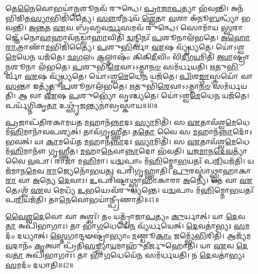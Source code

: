 𑌤𑍇\-\ul{𑌨𑍈}\-𑌵𑍋𑌭𑌯𑌾॑\-\ul{𑌨𑍍𑌪}\-𑌶𑍂𑌨𑌵᳴ 𑌰𑍁𑌨𑍍𑌧𑍇।
\-\ul{𑌪𑍍𑌰𑌾}\-\-\ul{𑌜𑌾}\-\-\ul{𑌪}\-𑌤𑍍𑌯𑌾 𑌭᳴𑌵𑌨𑍍𑌤𑌿।
𑌅𑌨᳴𑌭𑌿\-𑌜𑌿𑌤\-\ul{𑌸𑍍𑌯𑌾}\-𑌭𑌿\-𑌜𑌿᳴𑌤𑍍𑌯𑍈।
\-\ul{𑌸𑍗}\-𑌰𑍀𑌰𑍍𑌨𑌵᳴ \ul{𑌶𑍍𑌵𑍇}\-𑌤𑌾 \ul{𑌵}\-𑌶𑌾 𑌅᳴𑌨𑍂\-\ul{𑌬}\-𑌨𑍍𑌧𑍍𑌯𑌾᳴ 𑌭𑌵𑌨𑍍𑌤𑌿।
\-\ul{𑌅}\-\-\ul{𑌨𑍍𑌤}\-𑌤 \ul{𑌏}\-𑌵 𑌬𑍍𑌰᳴𑌹𑍍𑌮𑌵\-\ul{𑌰𑍍𑌚}\-𑌸𑌮𑌵᳴ 𑌰𑍁𑌨𑍍𑌧𑍇।
𑌸𑍋𑌮𑌾᳴𑌯 \ul{𑌸𑍍𑌵}\-𑌰𑌾𑌜𑍍𑌞𑍇᳴\-𑌽𑌨𑍋\-\ul{𑌵𑌾}\-𑌹𑌾𑌵᳴\-\ul{𑌨}\-𑌡𑍍𑌵𑌾\-\ul{𑌹𑌾}\-𑌵𑌿𑌤𑌿᳴ \ul{𑌦𑍍𑌵}\-𑌨𑍍𑌦𑍍𑌵𑌿𑌨𑌃᳴ \ul{𑌪}\-𑌶𑍂𑌨𑌾𑌲᳴𑌭𑌤𑍇।
\-\ul{𑌅}\-\-\ul{𑌹𑍋}\-\-\ul{𑌰𑌾}\-𑌤𑍍𑌰𑌾𑌣𑌾᳴\-\ul{𑌮}\-𑌭𑌿𑌜𑌿᳴𑌤𑍍𑌯𑍈।
\-\ul{𑌪}\-𑌶𑍁\-\ul{𑌭𑌿}\-𑌰𑍍𑌵𑌾 \ul{𑌏}\-𑌷 𑌵𑍍𑌯𑍃᳴𑌧𑍍𑌯𑌤𑍇।
𑌯𑍋॑𑌽𑌶𑍍𑌵\-\ul{𑌮𑍇}\-𑌧𑍇\-\ul{𑌨} 𑌯𑌜᳴𑌤𑍇।
\-\ul{𑌛}\-\-\ul{𑌗}\-𑌲𑌂 \ul{𑌕}\-𑌲𑍍𑌮𑌾𑌷𑌂᳴ 𑌕𑌿𑌕𑌿\-\ul{𑌦𑍀}\-𑌵𑌿𑌂 𑌵𑌿᳴\-\ul{𑌦𑍀}\-𑌗\-\ul{𑌯}\-𑌮𑌿𑌤𑌿᳴ \ul{𑌤𑍍𑌵𑌾}\-𑌷𑍍𑌟𑍍𑌰𑌾\-\ul{𑌨𑍍𑌪}\-𑌶𑍂𑌨𑌾 𑌲᳴𑌭𑌤𑍇।
\-\ul{𑌪}\-𑌶𑍁𑌭𑌿᳴\-\ul{𑌰𑍇}\-𑌵𑌾𑌽𑌽𑌤𑍍𑌮𑌾\-\ul{𑌨}\-\-\ul{𑍞} 𑌸𑌮᳴𑌰𑍍𑌧𑌯𑌤𑌿।
\-\ul{𑌋}\-𑌤𑍁\-\ul{𑌭𑌿}\-𑌰𑍍𑌵𑌾 \ul{𑌏}\-𑌷 𑌵𑍍𑌯𑍃᳴𑌧𑍍𑌯𑌤𑍇।
𑌯𑍋॑𑌽𑌶𑍍𑌵\-\ul{𑌮𑍇}\-𑌧𑍇\-\ul{𑌨} 𑌯𑌜᳴𑌤𑍇।
\-\ul{𑌪𑌿}\-𑌶\-\ul{𑌙𑍍𑌗𑌾}\-𑌸𑍍𑌤𑍍𑌰𑌯𑍋᳴ 𑌵𑌾\-\ul{𑌸}\-𑌨𑍍𑌤𑌾 𑌇𑌤𑍍𑌯𑍃᳴𑌤𑍁\-\ul{𑌪}\-𑌶𑍂𑌨𑌾𑌲᳴𑌭𑌤𑍇।
\-\ul{𑌋}\-𑌤𑍁𑌭𑌿᳴\-\ul{𑌰𑍇}\-𑌵𑌾𑌽𑌽𑌤𑍍𑌮𑌾\-\ul{𑌨}\-\-\ul{𑍞} 𑌸𑌮᳴𑌰𑍍𑌧𑌯𑌤𑌿।
𑌆 𑌵𑌾 \ul{𑌏}\-𑌷 \ul{𑌪}\-𑌶𑍁𑌭𑍍𑌯𑍋᳴ 𑌵𑍃𑌶𑍍𑌚𑍍𑌯𑌤𑍇।
𑌯𑍋॑𑌽𑌶𑍍𑌵\-\ul{𑌮𑍇}\-𑌧𑍇\-\ul{𑌨} 𑌯𑌜᳴𑌤𑍇।
𑌪𑌰𑍍𑌯᳴𑌗𑍍𑌨𑌿𑌕𑍃\-\ul{𑌤𑌾} 𑌉𑌥𑍍𑌸𑍃᳴\-\ul{𑌜}\-𑌨𑍍𑌤𑍍𑌯𑌨𑌾॑𑌵𑍍𑌰𑌸𑍍𑌕𑌾𑌯॥40॥\anuvakamend[\-\ul{𑌲}\-\-\ul{𑌭𑍍𑌯}\-\-\ul{𑌨𑍍𑌤𑍇} \ul{𑌲}\-\-\ul{𑌭}\-\-\ul{𑌤𑍇} \ul{𑌤𑍍𑌵𑌾}\-𑌷𑍍𑌟𑍍𑌰𑌾\-\ul{𑌨𑍍𑌪}\-𑌶𑍂𑌨𑌾𑌲᳴𑌭\-\ul{𑌤𑍇}\-\-𑌽𑌷𑍍𑌟𑍗 𑌚᳴]

\-\ul{𑌪𑍍𑌰}\-𑌜𑌾𑌪᳴𑌤𑌿𑌰𑌕𑌾𑌮𑌯𑌤 \ul{𑌮}\-𑌹𑌾𑌨᳴\-\ul{𑌨𑍍𑌨𑌾}\-𑌦𑌃 \ul{𑌸𑍍𑌯𑌾}\-𑌮𑌿𑌤𑌿᳴।
𑌸 \ul{𑌏}\-𑌤𑌾𑌵᳴𑌶𑍍𑌵\-\ul{𑌮𑍇}\-𑌧𑍇 𑌮᳴\-\ul{𑌹𑌿}\-𑌮𑌾𑌨𑌾᳴𑌵𑌪𑌶𑍍𑌯𑌤𑍍।
𑌤𑌾𑌵᳴𑌗𑍃𑌹𑍍𑌣𑍀𑌤।
𑌤\-\ul{𑌤𑍋} 𑌵𑍈 𑌸 \ul{𑌮}\-𑌹𑌾𑌨᳴\-\ul{𑌨𑍍𑌨𑌾}\-𑌦𑍋᳴\-𑌽𑌭𑌵𑌤𑍍।
𑌯𑌃 \ul{𑌕𑌾}\-𑌮𑌯𑍇᳴𑌤 \ul{𑌮}\-𑌹𑌾𑌨᳴\-\ul{𑌨𑍍𑌨𑌾}\-𑌦𑌃 \ul{𑌸𑍍𑌯𑌾}\-𑌮𑌿𑌤𑌿᳴।
𑌸 \ul{𑌏}\-𑌤𑌾𑌵᳴𑌶𑍍𑌵\-\ul{𑌮𑍇}\-𑌧𑍇 𑌮᳴\-\ul{𑌹𑌿}\-𑌮𑌾𑌨𑍗᳴ 𑌗𑍃𑌹𑍍𑌣𑍀𑌤।
\-\ul{𑌮}\-𑌹𑌾\-\ul{𑌨𑍇}\-𑌵𑌾\-\ul{𑌨𑍍𑌨𑌾}\-𑌦𑍋 𑌭᳴𑌵𑌤𑌿।
\-\ul{𑌯}\-\-\ul{𑌜}\-\-\ul{𑌮𑌾}\-\-\ul{𑌨}\-\-\ul{𑌦𑍇}\-\-\ul{𑌵}\-𑌤𑍍𑌯𑌾᳴ 𑌵𑍈 \ul{𑌵}\-𑌪𑌾।
𑌰𑌾𑌜𑌾᳴ 𑌮\-\ul{𑌹𑌿}\-𑌮𑌾।
𑌯\-\ul{𑌦𑍍𑌵}\-𑌪𑌾𑌂 𑌮᳴\-\ul{𑌹𑌿}\-𑌮𑍍𑌨𑍋\-\ul{𑌭}\-𑌯𑌤𑌃᳴ 𑌪\-\ul{𑌰𑌿}\-𑌯𑌜᳴𑌤𑌿।
𑌯𑌜᳴𑌮𑌾𑌨\-\ul{𑌮𑍇}\-𑌵 \ul{𑌰𑌾}\-𑌜𑍍𑌯𑍇𑌨𑍋᳴\-\ul{𑌭}\-𑌯\-\ul{𑌤𑌃} 𑌪𑌰𑌿᳴𑌗𑍃𑌹𑍍𑌣𑌾𑌤𑌿।
\-\ul{𑌪𑍁}\-𑌰𑌸𑍍𑌤𑌾॑𑌥𑍍𑌸𑍍𑌵𑌾𑌹𑌾𑌕𑌾\-\ul{𑌰𑌾} 𑌵𑌾 \ul{𑌅}\-𑌨𑍍𑌯𑍇 \ul{𑌦𑍇}\-𑌵𑌾𑌃।
\-\ul{𑌉}\-𑌪𑌰𑌿᳴𑌷𑍍𑌟𑌾𑌥𑍍𑌸𑍍𑌵𑌾𑌹𑌾𑌕𑌾𑌰𑌾 \ul{𑌅}\-𑌨𑍍𑌯𑍇।
𑌤𑍇 𑌵𑌾 \ul{𑌏}\-𑌤𑍇\-𑌽𑌶𑍍𑌵᳴ \ul{𑌏}\-𑌵 𑌮𑍇𑌧𑍍𑌯᳴ \ul{𑌉}\-𑌭𑌯𑍇\-𑌽𑌵᳴𑌰𑍁𑌧𑍍𑌯𑌨𑍍𑌤𑍇।
𑌯\-\ul{𑌦𑍍𑌵}\-𑌪𑌾𑌂 𑌮᳴\-\ul{𑌹𑌿}\-𑌮𑍍𑌨𑍋\-\ul{𑌭}\-𑌯𑌤𑌃᳴ 𑌪\-\ul{𑌰𑌿}\-𑌯𑌜᳴𑌤𑌿।
𑌤𑌾\-\ul{𑌨𑍇}\-𑌵𑍋𑌭𑌯𑌾॑𑌨𑍍𑌪𑍍𑌰𑍀𑌣𑌾𑌤𑌿॥41॥\anuvakamend[\-\ul{𑌪}\-\-\ul{𑌰𑌿}\-𑌯𑌜᳴\-\ul{𑌤𑌿} 𑌷𑌟𑍍𑌚᳴]

\-\ul{𑌵𑍈}\-\-\ul{𑌶𑍍𑌵}\-\-\ul{𑌦𑍇}\-𑌵𑍋 𑌵𑌾 𑌅𑌶𑍍𑌵𑌃᳴।
𑌤𑌂 𑌯𑌤𑍍𑌪𑍍𑌰𑌾᳴𑌜𑌾\-\ul{𑌪}\-𑌤𑍍𑌯𑌂 \ul{𑌕𑍁}\-𑌰𑍍𑌯𑌾𑌤𑍍।
𑌯𑌾 \ul{𑌦𑍇}\-𑌵\-\ul{𑌤𑌾} 𑌅𑌪𑌿᳴𑌭𑌾𑌗𑌾𑌃।
𑌤𑌾 𑌭𑌾᳴\-\ul{𑌗}\-𑌧𑍇𑌯𑍇᳴\-\ul{𑌨} 𑌵𑍍𑌯᳴𑌰𑍍𑌧𑌯𑍇𑌤𑍍।
\-\ul{𑌦𑍇}\-𑌵𑌤𑌾॑𑌭𑍍𑌯𑌃 \ul{𑌸}\-𑌮𑌦𑌂᳴ 𑌦𑌧𑍍𑌯𑌾𑌤𑍍।
\-\ul{𑌸𑍍𑌤𑍇}\-𑌗𑌾𑌨𑍍𑌦𑍟𑌷𑍍𑌟𑍍𑌰𑌾॑𑌭𑍍𑌯𑌾𑌂 \ul{𑌮}\-𑌣𑍍𑌡𑍂\-\ul{𑌕𑌾𑌂} 𑌜𑌮𑍍𑌭𑍍𑌯𑍇᳴\-\ul{𑌭𑌿}\-𑌰𑌿𑌤𑌿᳴।
𑌆𑌜𑍍𑌯᳴𑌮\-\ul{𑌵}\-𑌦𑌾𑌨𑌂᳴ \ul{𑌕𑍃}\-𑌤𑍍𑌵𑌾 𑌪𑍍𑌰᳴𑌤𑌿\-\ul{𑌸}\-𑌙𑍍𑌖𑍍𑌯𑌾\-\ul{𑌯}\-𑌮𑌾𑌹𑍁᳴𑌤𑍀𑌰𑍍𑌜𑍁𑌹𑍋𑌤𑌿।
𑌯𑌾 \ul{𑌏}\-𑌵 \ul{𑌦𑍇}\-𑌵\-\ul{𑌤𑌾} 𑌅𑌪𑌿᳴𑌭𑌾𑌗𑌾𑌃।
𑌤𑌾 𑌭𑌾᳴\-\ul{𑌗}\-𑌧𑍇𑌯𑍇᳴\-\ul{𑌨} 𑌸𑌮᳴𑌰𑍍𑌧𑌯𑌤𑌿।
𑌨 \ul{𑌦𑍇}\-𑌵𑌤𑌾॑𑌭𑍍𑌯𑌃 \ul{𑌸}\-𑌮𑌦𑌂᳴ 𑌦𑌧𑌾𑌤𑌿॥42॥

